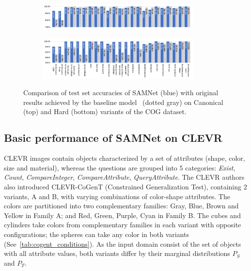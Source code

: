 \begin{figure}[t!]
	\centering
	\begin{subfigure}{\textwidth}
		\centering
		\includegraphics[width=0.9\textwidth]{../img/plots/cog_canonical_baseline_no_labels.pdf}
	\end{subfigure}%
	\newline
	\begin{subfigure}{\textwidth}
		\centering
		\includegraphics[width=0.9\textwidth]{../img/plots/cog_hard_baseline_labels.pdf}
	\end{subfigure}%
	\caption{Comparison of test set accuracies of SAMNet (blue) with original results achieved by the baseline model~\cite{yang2018dataset} (dotted gray) on Canonical (top) and Hard (bottom) variants of the COG dataset.}
	\label{fig:samnet_cog_detailed}
\end{figure}

\subsection{Basic performance of SAMNet on CLEVR}
\label{sec:clevr-baseline-compare}
CLEVR images contain objects characterized by a set of attributes (shape, color, size and material), whereas the questions are grouped into 5 categories: \textit{Exist}, \textit{Count}, \textit{CompareInteger}, \textit{CompareAttribute}, \textit{QueryAttribute}.
The CLEVR authors also introduced CLEVR-CoGenT (Constrained Generalization Test), containing 2 variants, A and B, with varying combinations of color-shape attributes.
The colors are partitioned into two complementary families:
Gray, Blue, Brown and Yellow in Family A; and Red, Green, Purple, Cyan in Family B.
The cubes and cylinders take colors from complementary families in each variant with opposite configurations; the spheres can take any color in both variants (See~\cref{tab:cogent_conditions}).
As the input domain consist of the set of objects with all attribute values, both variants differ by their marginal distributions $P_S$ and $P_T$.

